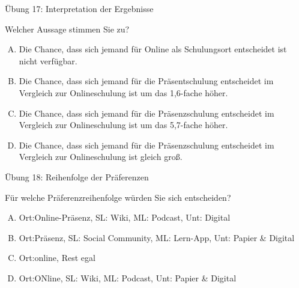 \documentclass[12pt,ngerman,a4paper,ignorenonframetext,]{beamer}
\providecommand{\tightlist}{%
  \setlength{\itemsep}{0pt}\setlength{\parskip}{0pt}}
\begin{document}
\begin{frame}{Übung 17: Interpretation der Ergebnisse}
\protect\hypertarget{ubung-17-interpretation-der-ergebnisse}{}

Welcher Aussage stimmen Sie zu?

\begin{enumerate}
[A.]
\tightlist
\item
  Die Chance, dass sich jemand für Online als Schulungsort entscheidet
  ist nicht verfügbar.
\item
  Die Chance, dass sich jemand für die Präsentschulung entscheidet im
  Vergleich zur Onlineschulung ist um das 1,6-fache höher.
\item
  Die Chance, dass sich jemand für die Präsenzschulung entscheidet im
  Vergleich zur Onlineschulung ist um das 5,7-fache höher.
\item
  Die Chance, dass sich jemand für die Präsenzschulung entscheidet im
  Vergleich zur Onlineschulung ist gleich groß.
\end{enumerate}


\end{frame}

\begin{frame}{Übung 18: Reihenfolge der Präferenzen}
\protect\hypertarget{ubung-18-reihenfolge-der-praferenzen}{}

Für welche Präferenzreihenfolge würden Sie sich entscheiden?

\begin{enumerate}
[A.]
\tightlist
\item
  Ort:Online-Präsenz, SL: Wiki, ML: Podcast, Unt: Digital
\item
  Ort:Präsenz, SL: Social Community, ML: Lern-App, Unt: Papier \&
  Digital
\item
  Ort:online, Rest egal
\item
  Ort:ONline, SL: Wiki, ML: Podcast, Unt: Papier \& Digital
\end{enumerate}


\end{frame}
\end{document}
